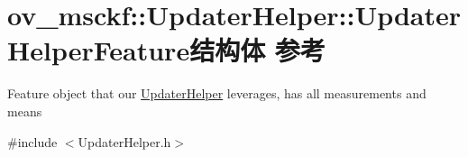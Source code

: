 \hypertarget{structov__msckf_1_1UpdaterHelper_1_1UpdaterHelperFeature}{}\section{ov\+\_\+msckf\+:\+:Updater\+Helper\+:\+:Updater\+Helper\+Feature结构体 参考}
\label{structov__msckf_1_1UpdaterHelper_1_1UpdaterHelperFeature}


Feature object that our \hyperlink{classov__msckf_1_1UpdaterHelper}{Updater\+Helper} leverages, has all measurements and means  




{\ttfamily \#include $<$Updater\+Helper.\+h$>$}

